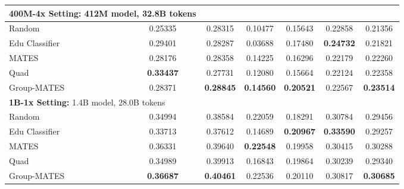 \begin{table*}[t]
\begin{sc}
{\begin{tabular}{l|cccccc}
    \multicolumn{2}{l}{\textbf{400M-4x Setting:} 412M model, 32.8B tokens}\\
    \midrule
    Random & 0.25335 & 0.28315 & 0.10477 & 0.15643 & 0.22858 & 0.21356 \\
    Edu Classifier & 0.29401 & 0.28287 & 0.03688 & 0.17480 & \textbf{0.24732} & 0.21821 \\
    MATES & 0.28176 & 0.28358 & 0.14225 & 0.16296 & 0.22179 & 0.22260 \\
    Quad & \textbf{0.33437} & 0.27731 & 0.12080 & 0.15664 & 0.22124 & 0.22358 \\
    \rowcolor{blue!10} Group-MATES & 0.28371 & \textbf{0.28845} & \textbf{0.14560} & \textbf{0.20521} & 0.22567 & \textbf{0.23514} \\
    \midrule
    \multicolumn{2}{l}{\textbf{1B-1x Setting:} 1.4B model, 28.0B tokens}\\
    \midrule
    Random & 0.34994 & 0.38584 & 0.22059 & 0.18291 & 0.30784 & 0.29456 \\
    Edu Classifier & 0.33713 & 0.37612 & 0.14689 & \textbf{0.20967} & \textbf{0.33590} & 0.29257 \\
    MATES & 0.36331 & 0.39640 & \textbf{0.22548} & 0.19958 & 0.30415 & 0.30288 \\
    Quad &  0.34989 & 0.39913 & 0.16843 & 0.19864 & 0.30239 & 0.29340 \\
    \rowcolor{blue!10} Group-MATES & \textbf{0.36687} & \textbf{0.40461} & 0.22536 & 0.20110 & 0.30817 & \textbf{0.30685} \\
    \bottomrule
  \end{tabular}
  }
  \end{sc}
  \vspace{-0.3cm}
\end{table*}